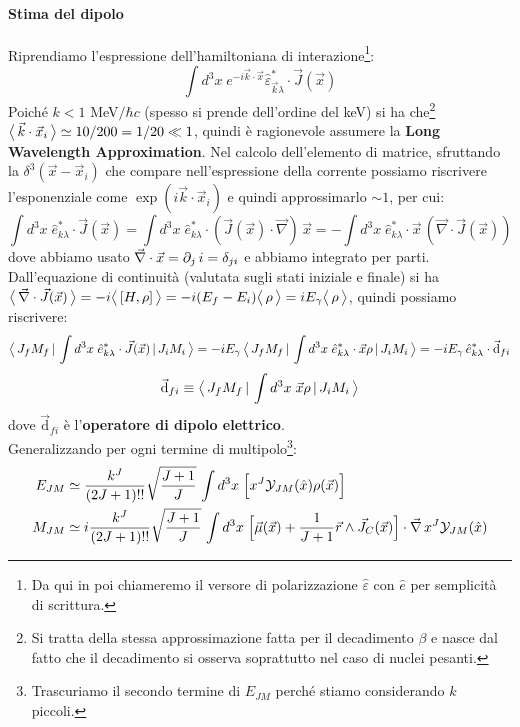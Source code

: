 \paragraph{Stima del dipolo} Riprendiamo l'espressione dell'hamiltoniana di interazione\footnote{Da qui in poi chiameremo il versore di polarizzazione $\widehat{\varepsilon}$ con $\hat{e}$ per semplicità di scrittura.}:
$$\int d^3x \; e^{-i\vec{k}\cdot\vec{x}}\widehat{\varepsilon}^*_{\vec{k}\lambda}\cdot\vec{J} (\vec{x})$$
Poiché $k< 1$ MeV$/\hbar c$ (spesso si prende dell'ordine del keV) si ha che\footnote{Si tratta della stessa approssimazione fatta per il decadimento $\beta$ e nasce dal fatto che il decadimento si osserva soprattutto nel caso di nuclei pesanti.} $\bigl\langle\, \vec{k}\cdot\vec{x}_i\, \bigr\rangle\simeq 10/200 = 1/20\ll 1$, quindi è ragionevole assumere la \textbf{Long Wavelength Approximation}. Nel calcolo dell'elemento di matrice, sfruttando la $\delta^3(\vec{x}-\vec{x}_i)$ che compare nell'espressione della corrente possiamo riscrivere l'esponenziale come $\exp{(i\vec{k}\cdot\vec{x}_i)}$ e quindi approssimarlo $\sim 1$, per cui:
$$\int d^3x\; \hat{e}_{k\lambda}^* \cdot \vec{J}(\vec{x}) = \int d^3x\; \hat{e}_{k\lambda}^* \cdot (\vec{J}(\vec{x})\cdot \vec{\nabla})\,\vec{x} = - \int d^3x \; \hat{e}_{k\lambda}^* \cdot \vec{x}\, (\vec{\nabla}\cdot\vec{J}(\vec{x})) $$
dove abbiamo usato $\vec{\nabla}\cdot\vec{x} = \partial_j \,i = \delta_{ji}$ e abbiamo integrato per parti. Dall'equazione di continuità (valutata sugli stati iniziale e finale) si ha $\bigl\langle\, \vec{\nabla}\cdot\vec{J}(\vec{x})\, \bigr\rangle = -i\bigl\langle\, [H,\rho]\, \bigr\rangle = -i(E_f-E_i)\bigl\langle\, \rho\, \bigr\rangle = i E_\gamma \bigl\langle\, \rho\, \bigr\rangle$, quindi possiamo riscrivere:
$$\bigl\langle\, J_fM_f\, |\,\int d^3x \; \hat{e}^*_{k\lambda}\cdot \vec{J}(\vec{x})\, |\,J_iM_i\, \bigr\rangle = -iE_\gamma \, \bigl\langle\, J_fM_f\, |\,\int d^3x \; \hat{e}^*_{k\lambda}\cdot \vec{x}\rho\, |\,J_iM_i\, \bigr\rangle = -i E_\gamma \, \hat{e}^*_{k\lambda} \cdot \vec{\mathrm{d}}_{fi}$$
$$\vec{\mathrm{d}}_{fi} \equiv \bigl\langle\, J_fM_f\, |\,\int d^3x \; \vec{x}\rho\, |\,J_iM_i\, \bigr\rangle$$
dove $\vec{\mathrm{d}}_{fi}$ è l'\textbf{operatore di dipolo elettrico}.\\
Generalizzando per ogni termine di multipolo\footnote{Trascuriamo il secondo termine di $E_{JM}$ perché stiamo considerando $k$ piccoli.}:
\begin{displaymath}
\begin{aligned}
E_{JM} &\simeq \frac{k^J}{(2J+1)!!} \sqrt{\frac{J+1}{J}}\, \int d^3x \; \Bigl [ x^J \mathcal{Y}_{JM}(\hat{x})\rho(\vec{x}) \Bigr ] \\
M_{JM} &\simeq i\frac{k^J}{(2J+1)!!} \sqrt{\frac{J+1}{J}}\, \int d^3x \; \Bigl [ \vec{\mu}(\vec{x}) + \frac{1}{J+1} \vec{r}\land \vec{J}_C(\vec{x}) \Bigr ]\cdot \vec{\nabla}\,x^J\mathcal{Y}_{JM}(\hat{x})
\end{aligned}
\end{displaymath}
